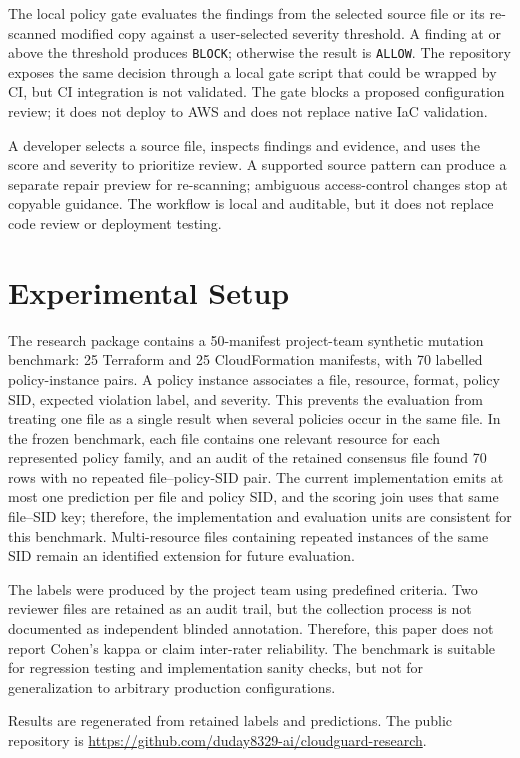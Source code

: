 \documentclass[conference]{IEEEtran}
\begin{document}
The local policy gate evaluates the findings from the selected source file or its re-scanned modified copy against a user-selected severity threshold. A finding at or above the threshold produces \texttt{BLOCK}; otherwise the result is \texttt{ALLOW}. The repository exposes the same decision through a local gate script that could be wrapped by CI, but CI integration is not validated. The gate blocks a proposed configuration review; it does not deploy to AWS and does not replace native IaC validation.

A developer selects a source file, inspects findings and evidence, and uses the score and severity to prioritize review. A supported source pattern can produce a separate repair preview for re-scanning; ambiguous access-control changes stop at copyable guidance. The workflow is local and auditable, but it does not replace code review or deployment testing.

\section{Experimental Setup}
The research package contains a 50-manifest project-team synthetic mutation benchmark: 25 Terraform and 25 CloudFormation manifests, with 70 labelled policy-instance pairs. A policy instance associates a file, resource, format, policy SID, expected violation label, and severity. This prevents the evaluation from treating one file as a single result when several policies occur in the same file. In the frozen benchmark, each file contains one relevant resource for each represented policy family, and an audit of the retained consensus file found 70 rows with no repeated file--policy-SID pair. The current implementation emits at most one prediction per file and policy SID, and the scoring join uses that same file--SID key; therefore, the implementation and evaluation units are consistent for this benchmark. Multi-resource files containing repeated instances of the same SID remain an identified extension for future evaluation.

The labels were produced by the project team using predefined criteria. Two reviewer files are retained as an audit trail, but the collection process is not documented as independent blinded annotation. Therefore, this paper does not report Cohen's kappa or claim inter-rater reliability. The benchmark is suitable for regression testing and implementation sanity checks, but not for generalization to arbitrary production configurations.

Results are regenerated from retained labels and predictions. The public repository is \url{https://github.com/duday8329-ai/cloudguard-research}.
\end{document}
